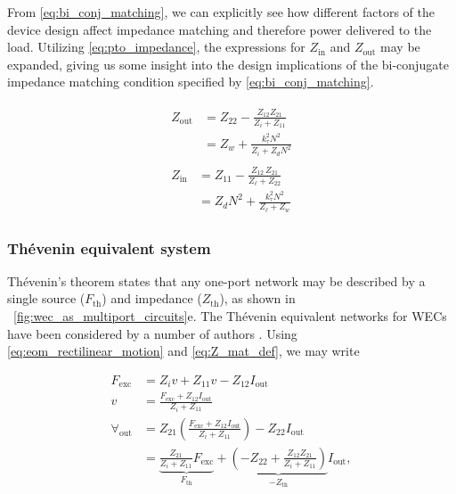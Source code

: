 \documentclass[lettersize,journal]{IEEEtran}
\begin{document}
\noindent{}From \eqref{eq:bi_conj_matching}, we can explicitly see how different factors of the device design affect impedance matching and therefore power delivered to the load.
Utilizing \eqref{eq:pto_impedance}, the expressions for $Z_{\textrm{in}}$ and $Z_{\textrm{out}}$ may be expanded, giving us some insight into the design implications of the bi-conjugate impedance matching condition specified by \eqref{eq:bi_conj_matching}.

\begin{subequations}
\begin{align}
        \begin{split}
                Z_{\textrm{out}} &=  Z_{22} - \frac{Z_{12} Z_{21}}{Z_{i} + Z_{11}} \\[0.5em]
                &=  Z_w + \frac{k_\tau^2 N^2}{Z_i + Z_d N^2}
        \end{split}\label{eq:expanded_zin} \\[1em]
        \begin{split}
                Z_{\textrm{in}} &= Z_{11} - \frac{Z_{12} \, Z_{21}}{Z_\ell + Z_{22}} \\[0.5em]
                &= Z_d N^2 + \frac{k_\tau^2 N^2}{Z_\ell + Z_w}
        \end{split}\label{eq:expanded_zout}
\end{align}\label{eq:expanded_z}
\end{subequations}

\subsubsection{Th\'{e}venin equivalent system}\label{sec:thevenin_equivalent_system}
Th\'{e}venin's theorem \cite{Thevenin:1883aa} states that any one-port network may be described by a single source ($F_{\textrm{th}}$) and impedance ($Z_{\textrm{th}}$), as shown in \figurename~\ref{fig:wec_as_multiport_circuits}e.
The Th\'{e}venin equivalent networks for WECs have been considered by a number of authors \cite{Bacelli:2021aa,Blanco:2019aa,Bubbar:2018aa,Lewis:2013aa}.
Using \eqref{eq:eom_rectilinear_motion} and \eqref{eq:Z_mat_def}, we may write

\begin{equation}
        \nonumber
        \begin{split}
                F_{\textrm{exc}} &= Z_i v + Z_{11} v - Z_{12}I_{\textrm{out}} \\
                v &= \frac{F_{\textrm{exc}} + Z_{12}I_{\textrm{out}} }{Z_i + Z_{11}} \\[0.5em]
                \forall_{\textrm{out}}  &= Z_{21}\left(\frac{F_{\textrm{exc}} + Z_{12}I_{\textrm{out}} }{Z_i + Z_{11}}\right) - Z_{22}I_{\textrm{out}} \\
                &= \underbrace{\frac{Z_{21}}{Z_i + Z_{11}} F_\textrm{exc}}_{F_{\textrm{th}}} + \underbrace{\left( - Z_{22} + \frac{Z_{12}Z_{21}}{Z_i + Z_{11}}\right)}_{-Z_\textrm{th}} I_{\textrm{out}} , \\
        \end{split}
\end{equation}
\end{document}
